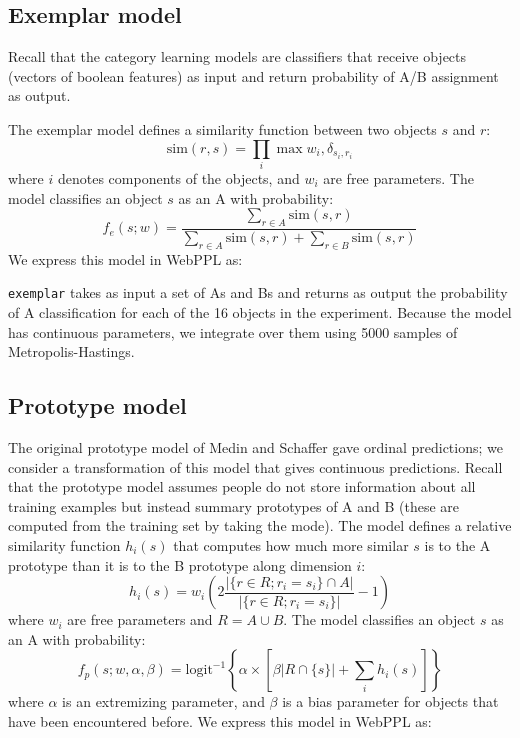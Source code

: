 \documentclass{article}
\begin{document}
\subsection{Exemplar model}

Recall that the category learning models are classifiers that receive objects (vectors of boolean features) as input and return probability of A/B assignment as output.

The exemplar model defines a similarity function between two objects $s$ and $r$:
$$ \text{sim}(r, s) = \prod_i{\max{w_i, \delta_{s_i,r_i}}  }$$
where $i$ denotes components of the objects, and $w_i$ are free parameters.
The model classifies an object $s$ as an A with probability:
$$ f_e(s ; w) = \frac{ \sum\limits_{r \in A}{\text{sim}(s,r)}}{
\sum\limits_{r \in A}{\text{sim}(s,r)} +
\sum\limits_{r \in B}{\text{sim}(s,r)}
 }$$
We express this model in WebPPL as:


\lstinline{exemplar} takes as input a set of As and Bs and returns as output the probability of A classification for each of the 16 objects in the experiment.
Because the model has continuous parameters, we integrate over them using 5000 samples of Metropolis-Hastings.

\subsection{Prototype model}

The original prototype model of Medin and Schaffer gave ordinal predictions; we consider a transformation of this model that gives continuous predictions.
Recall that the prototype model assumes people do not store information about all training examples but instead summary prototypes of A and B (these are computed from the training set by taking the mode).
The model defines a relative similarity function $h_i(s)$ that computes how much more similar $s$ is to the A prototype than it is to the B prototype along dimension $i$:
$$ h_i(s) =  w_i\left(2\frac{|\{r \in R ; r_i = s_i \} \cap A |}{|\{r \in R ; r_i = s_i \}|} - 1\right)$$
where $w_i$ are free parameters and $R = A \cup B$.
The model classifies an object $s$ as an A with probability:
$$ f_p(s ; w, \alpha, \beta) = \mathrm{logit}^{-1}\left\{ \alpha \times \left[ \beta |R \cap \{s\}| + \sum\limits_{i}{h_i(s)} \right] \right\}$$
where $\alpha$ is an extremizing parameter, and $\beta$ is a bias parameter for objects that have been encountered before. We express this model in WebPPL as:

\end{document}
